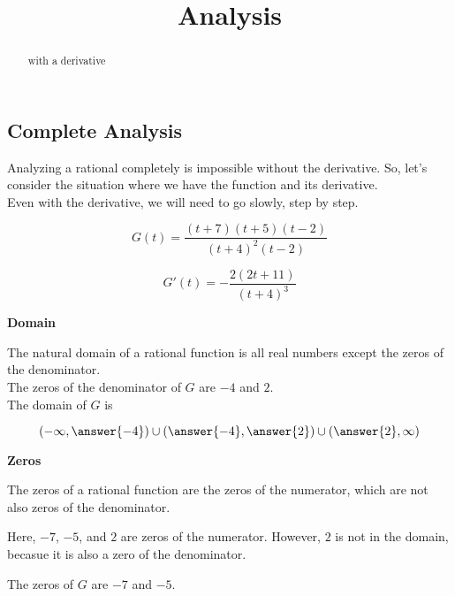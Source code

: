 \documentclass{ximera}
\title{Analysis}
\begin{document}
\begin{abstract}
with a derivative
\end{abstract}
\maketitle





\subsection*{Complete Analysis}


Analyzing a rational completely is impossible without the derivative. So, let's consider the situation where we have the function and its derivative. \\

Even with the derivative, we will need to go slowly, step by step.



\[
G(t) = \frac{(t+7)(t+5)(t-2)}{(t+4)^2(t-2)}
\]

\[
G'(t) = -\frac{2(2t+11)}{(t+4)^3}
\]



\textbf{\textcolor{purple!85!blue}{Domain}} \\

\begin{explanation}

The natural domain of a rational function is all real numbers except the zeros of the denominator. \\

The zeros of the denominator of $G$ are $-4$ and $2$. \\


The domain of $G$ is 

\[
\left( -\infty, \answer{-4} \right) \cup \left(\answer{-4}, \answer{2} \right) \cup \left( \answer{2}, \infty \right)
\]


\end{explanation}









\textbf{\textcolor{purple!85!blue}{Zeros}} \\
\begin{explanation}

The zeros of a rational function are the zeros of the numerator, which are not also zeros of the denominator.


Here, $-7$, $-5$, and $2$ are zeros of the numerator.  However, $2$ is not in the domain, becasue it is also a zero of the denominator.


The zeros of $G$ are $-7$ and $-5$.


\end{explanation}
\end{document}
